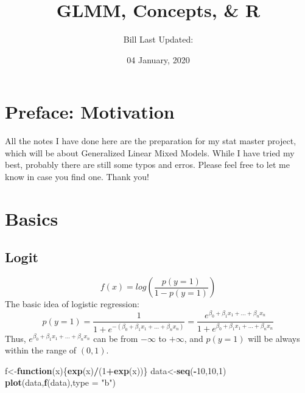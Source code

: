 \documentclass[]{book}
\title{GLMM, Concepts, \& R}
\author{Bill Last Updated:}
\date{04 January, 2020}
\newenvironment{Shaded}{\begin{snugshade}}{\end{snugshade}}
\newcommand{\KeywordTok}[1]{\textcolor[rgb]{0.13,0.29,0.53}{\textbf{#1}}}
\newcommand{\DataTypeTok}[1]{\textcolor[rgb]{0.13,0.29,0.53}{#1}}
\newcommand{\DecValTok}[1]{\textcolor[rgb]{0.00,0.00,0.81}{#1}}
\newcommand{\StringTok}[1]{\textcolor[rgb]{0.31,0.60,0.02}{#1}}
\newcommand{\ControlFlowTok}[1]{\textcolor[rgb]{0.13,0.29,0.53}{\textbf{#1}}}
\newcommand{\OperatorTok}[1]{\textcolor[rgb]{0.81,0.36,0.00}{\textbf{#1}}}
\newcommand{\NormalTok}[1]{#1}
\begin{document}
\maketitle

{
\setcounter{tocdepth}{1}
\tableofcontents
}
\chapter*{Preface: Motivation}\label{my-section}

All the notes I have done here are the preparation for my stat master
project, which will be about Generalized Linear Mixed Models. While I
have tried my best, probably there are still some typos and erros.
Please feel free to let me know in case you find one. Thank you!

\chapter{Basics}\label{basics}

\section{Logit}\label{logit}

\[f(x)=log(\frac{p(y=1)}{1-p(y=1)})\] The basic idea of logistic
regression:
\[p(y=1)=\frac{1}{1+e^{-(\beta_0+\beta_1x_1+...+\beta_nx_n)}}=\frac{e^{\beta_0+\beta_1x_1+...+\beta_nx_n}}{1+e^{\beta_0+\beta_1x_1+...+\beta_nx_n}}\]
Thus, \(e^{\beta_0+\beta_1x_1+...+\beta_nx_n}\) can be from \(-\infty\)
to \(+\infty\), and \(p(y=1)\) will be always within the range of
\((0,1)\).

\begin{Shaded}
\begin{Highlighting}[]
\NormalTok{f<-}\ControlFlowTok{function}\NormalTok{(x)\{}\KeywordTok{exp}\NormalTok{(x)}\OperatorTok{/}\NormalTok{(}\DecValTok{1}\OperatorTok{+}\KeywordTok{exp}\NormalTok{(x))\}}
\NormalTok{data<-}\KeywordTok{seq}\NormalTok{(}\OperatorTok{-}\DecValTok{10}\NormalTok{,}\DecValTok{10}\NormalTok{,}\DecValTok{1}\NormalTok{)}
\KeywordTok{plot}\NormalTok{(data,}\KeywordTok{f}\NormalTok{(data),}\DataTypeTok{type =} \StringTok{"b"}\NormalTok{)}
\end{Highlighting}
\end{Shaded}
\end{document}
